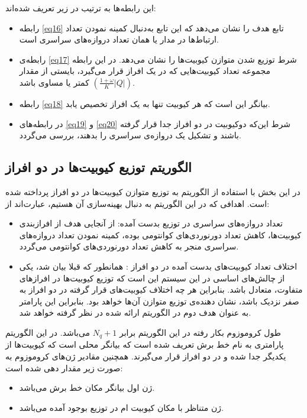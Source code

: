  این رابطه‌ها به ترتیب در زیر تعریف شده‌اند:
\begin{itemize}
\item
رابطه \eqref{eq16} تابع هدف را نشان می‌دهد که این تابع به‌دنبال کمینه نمودن تعداد ارتباط‌‌ها در مدار یا همان تعداد دروازه‌های سراسری است.
\item
رابطه‌ی \eqref{eq17} شرط توزیع شدن متوازن کیوبیت‌ها را نشان می‌دهد. در این رابطه مجموعه تعداد کیوبیت‌هایی که در یک افراز قرار می‌گیرد، بایستی از مقدار $(\frac{1+\omega}{K}|Q|)$ کمتر یا مساوی باشد.
\item

رابطه \eqref{eq18} بیانگر این است که هر کیوبیت تنها به یک افراز تخصیص یابد. 
\item
در رابطه‌های \eqref{eq19} و \eqref{eq20} شرط این‌که دوکیوبیت در دو افراز جدا قرار گرفته باشند و تشکیل یک دروازه‌ی سراسری را بدهند، بررسی می‌گردد.
\end{itemize}




 
\subsection{الگوریتم توزیع کیوبیت‌ها در دو افراز}
در این بخش با استفاده از الگوریتم  به توزیع متوازن کیوبیت‌ها در دو افراز پرداخته شده است. اهدافی که در این الگوریتم به دنبال بهینه‌سازی آن هستیم، عبارت‌اند از:
\begin{itemize}
\item
تعداد دروازه‌های سراسری در توزیع بدست آمده: از آنجایی هدف از افرازبندی کیوبیت‌ها، کاهش تعداد دورنوردی‌های کوانتومی بوده، كمينه نمودن تعداد دروازه‌های سراسری منجر به کاهش تعداد دورنوردی‌های کوانتومی می‌گردد. 
\item
اختلاف تعداد کیوبیت‌های بدست آمده در دو افراز : همانطور که قبلا بیان شد، یکی از چالش‌های اساسی در این سیستم این است که توزیع کیوبیت‌ها در افرازهای متفاوت، متعادل باشد.  بنابراین هر چه اختلاف کیوبیت‌های قرار گرفته در دو افراز به صفر نزدیک باشد، نشان دهنده‌ی توزیع متوازن آن‌ها خواهد بود. بنابراین این پارامتر به عنوان هدف دوم در الگوریتم ارائه شده در نظر گرفته خواهد شد.
\end{itemize}
طول کروموزوم بکار رفته در این الگوریتم برابر $N_q+1 $ می‌باشد. در این الگوریتم پارامتری به نام خط برش  تعریف شده است که بیانگر محلی است که کیوبیت‌ها از یکدیگر جدا شده و در دو افراز قرار می‌گیرند. همچنین مقادیر ژن‌های کروموزوم به صورت زیر مقدار دهی شده است:
\begin{itemize}
\item
ژن اول بیانگر مکان خط برش می‌باشد. 
\item
ژن  متناظر با مکان کیوبیت ام در توزیع بوجود آمده می‌باشد.
\end{itemize}
 
